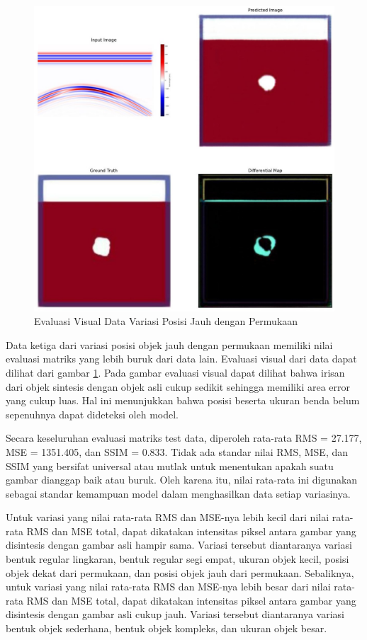 \begin{figure}[ht]
  \centering
  \includegraphics[scale=0.15]{gambar/diffMapDalam.jpg}
  \caption{Evaluasi Visual Data Variasi Posisi Jauh dengan Permukaan}
  \label{fig:diffmapdalam}
\end{figure}

Data ketiga dari variasi posisi objek jauh dengan permukaan memiliki nilai evaluasi matriks yang lebih buruk dari data lain. 
Evaluasi visual dari data dapat dilihat dari gambar \ref{fig:diffmapdalam}. 
Pada gambar evaluasi visual dapat dilihat bahwa irisan dari objek sintesis dengan objek asli cukup sedikit sehingga memiliki area error yang cukup luas. 
Hal ini menunjukkan bahwa posisi beserta ukuran benda belum sepenuhnya dapat dideteksi oleh model.  

Secara keseluruhan evaluasi matriks test data, diperoleh rata-rata RMS = 27.177, MSE = 1351.405, dan SSIM = 0.833. 
Tidak ada standar nilai RMS, MSE, dan SSIM yang bersifat universal atau mutlak untuk menentukan apakah suatu gambar dianggap baik atau buruk. 
Oleh karena itu, nilai rata-rata ini digunakan sebagai standar kemampuan model dalam menghasilkan data setiap variasinya.

Untuk variasi yang nilai rata-rata RMS dan MSE-nya lebih kecil dari nilai rata-rata RMS dan MSE total, dapat dikatakan intensitas piksel antara gambar yang disintesis dengan gambar asli hampir sama. 
Variasi tersebut diantaranya variasi bentuk regular lingkaran, bentuk regular segi empat, ukuran objek kecil, posisi objek dekat dari permukaan, dan posisi objek jauh dari permukaan. 
Sebaliknya, untuk variasi yang nilai rata-rata RMS dan MSE-nya lebih besar dari nilai rata-rata RMS dan MSE total, dapat dikatakan intensitas piksel antara gambar yang disintesis dengan gambar asli cukup jauh. 
Variasi tersebut diantaranya variasi bentuk objek sederhana, bentuk objek kompleks, dan ukuran objek besar.

